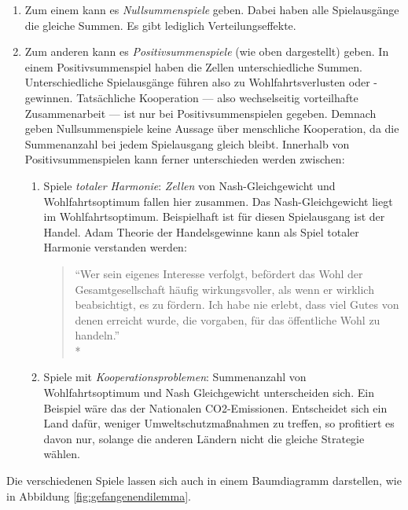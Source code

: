 \begin{enumerate}
	\item Zum einem kann es \emph{Nullsummenspiele} geben.
	Dabei haben alle Spielausgänge die gleiche Summen.
	Es gibt lediglich Verteilungseffekte.
	\item Zum anderen kann es \emph{Positivsummenspiele} (wie oben dargestellt) geben.
	In einem Positivsummenspiel haben die Zellen unterschiedliche Summen. Unterschiedliche Spielausgänge führen also zu Wohlfahrtsverlusten oder -gewinnen.
	Tatsächliche Kooperation --- also wechselseitig vorteilhafte Zusammenarbeit --- ist nur bei Positivsummenspielen gegeben.
	Demnach geben Nullsummenspiele keine Aussage über menschliche Kooperation, da die Summenanzahl bei jedem Spielausgang gleich bleibt.
	Innerhalb von Positivsummenspielen kann ferner unterschieden werden zwischen:
	\begin{enumerate}
		\item Spiele \emph{totaler Harmonie}: \emph{Zellen} von Nash-Gleichgewicht und Wohlfahrtsoptimum fallen hier zusammen.
		Das Nash-Gleichgewicht liegt im Wohlfahrtsoptimum.
		Beispielhaft ist für diesen Spielausgang ist der Handel.
		Adam \textcite{Smith-1776-lq} Theorie der Handelsgewinne kann als Spiel totaler Harmonie verstanden werden:
		\begin{quote}
			``Wer sein eigenes Interesse verfolgt, befördert das Wohl der Gesamtgesellschaft häufig wirkungsvoller, als wenn er wirklich beabsichtigt, es zu fördern.
			Ich habe nie erlebt, dass viel Gutes von denen erreicht wurde, die vorgaben, für das öffentliche Wohl zu handeln.''\\*
			\parencite{Smith-1776-lq}
		\end{quote}

		\item Spiele mit \emph{Kooperationsproblemen}: Summenanzahl von Wohlfahrtsoptimum und Nash Gleichgewicht unterscheiden sich.
		Ein Beispiel wäre das der Nationalen CO2-Emissionen.
		Entscheidet sich ein Land dafür, weniger Umweltschutzmaßnahmen zu treffen, so profitiert es davon nur, solange die anderen Ländern nicht die gleiche Strategie wählen.
	\end{enumerate}
\end{enumerate}

Die verschiedenen Spiele lassen sich auch in einem Baumdiagramm darstellen, wie in Abbildung \ref{fig:gefangenendilemma}.

